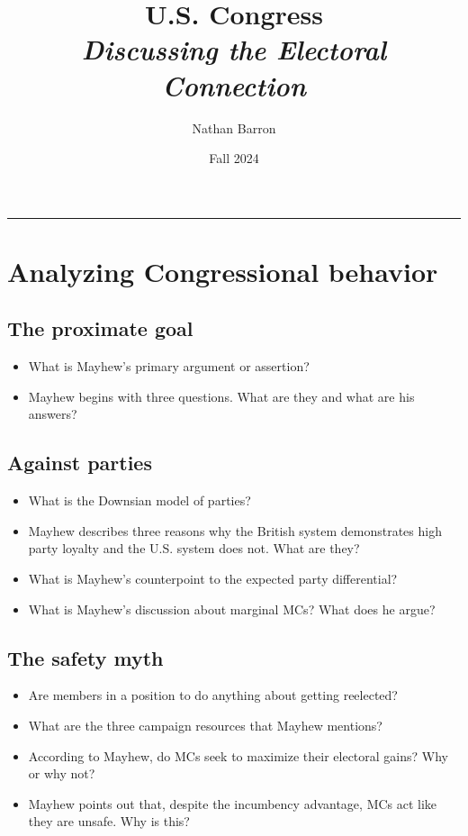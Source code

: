 \documentclass[10pt]{article}
\title{\textbf{U.S. Congress}\\\textit{Discussing the Electoral Connection}}
\author{Nathan Barron}
\date{Fall 2024}
\begin{document}
\maketitle
\tableofcontents
\vspace{.25in}
\hrule
\vspace{.25in}


\section{Analyzing Congressional behavior}
\subsection{The proximate goal}
\begin{itemize}
    \item What is Mayhew's primary argument or assertion?
    \item Mayhew begins with three questions. What are they and what are his answers? 
\end{itemize}
\subsection{Against parties}
\begin{itemize}
    \item What is the Downsian model of parties?
    \item Mayhew describes three reasons why the British system demonstrates high party loyalty and the U.S. system does not. What are they?
    \item What is Mayhew's counterpoint to the expected party differential?
    \item What is Mayhew's discussion about marginal MCs? What does he argue? 
\end{itemize}
\subsection{The safety myth}
\begin{itemize}
    \item Are members in a position to do anything about getting reelected? 
    \item What are the three campaign resources that Mayhew mentions?
    \item According to Mayhew, do MCs seek to maximize their electoral gains? Why or why not?
    \item Mayhew points out that, despite the incumbency advantage, MCs act like they are unsafe. Why is this?
\end{itemize}
\end{document}
